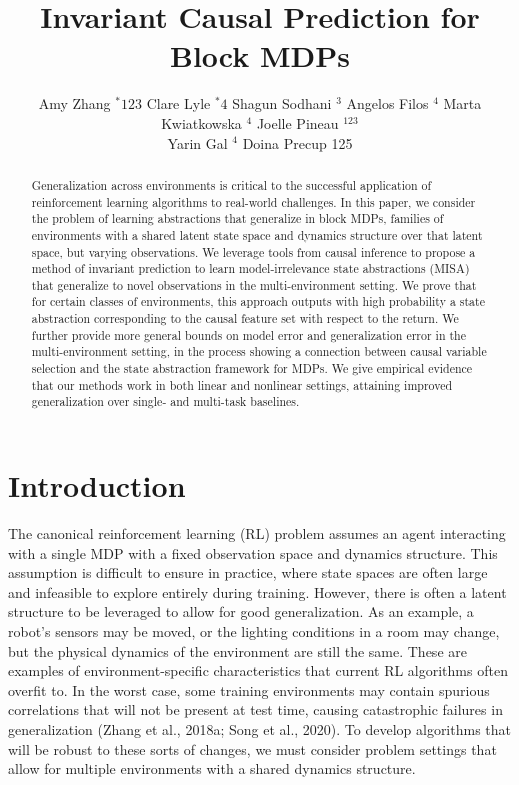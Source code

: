\documentclass[10pt]{article}
\title{Invariant Causal Prediction for Block MDPs }
\author{Amy Zhang ${ }^{*} 123$ Clare Lyle $^{*} 4$ Shagun Sodhani $^{3}$ Angelos Filos $^{4}$ Marta Kwiatkowska $^{4}$ Joelle Pineau $^{123}$\\
Yarin Gal $^{4}$ Doina Precup 125}
\date{}
\begin{document}
\maketitle


\begin{abstract}
Generalization across environments is critical to the successful application of reinforcement learning algorithms to real-world challenges. In this paper, we consider the problem of learning abstractions that generalize in block MDPs, families of environments with a shared latent state space and dynamics structure over that latent space, but varying observations. We leverage tools from causal inference to propose a method of invariant prediction to learn model-irrelevance state abstractions (MISA) that generalize to novel observations in the multi-environment setting. We prove that for certain classes of environments, this approach outputs with high probability a state abstraction corresponding to the causal feature set with respect to the return. We further provide more general bounds on model error and generalization error in the multi-environment setting, in the process showing a connection between causal variable selection and the state abstraction framework for MDPs. We give empirical evidence that our methods work in both linear and nonlinear settings, attaining improved generalization over single- and multi-task baselines.
\end{abstract}

\section{Introduction}
The canonical reinforcement learning (RL) problem assumes an agent interacting with a single MDP with a fixed observation space and dynamics structure. This assumption is difficult to ensure in practice, where state spaces are often large and infeasible to explore entirely during training. However, there is often a latent structure to be leveraged to allow for good generalization. As an example, a robot's sensors may be moved, or the lighting conditions in a room may change, but the physical dynamics of the environment are still the same. These are examples of environment-specific characteristics that current RL algorithms often overfit to. In the worst case, some training environments may contain spurious correlations that will not be present at test time, causing catastrophic failures in generalization (Zhang et al., 2018a; Song et al., 2020). To develop algorithms that will be robust to these sorts of changes, we must consider problem settings that allow for multiple environments with a shared dynamics structure.
\end{document}
